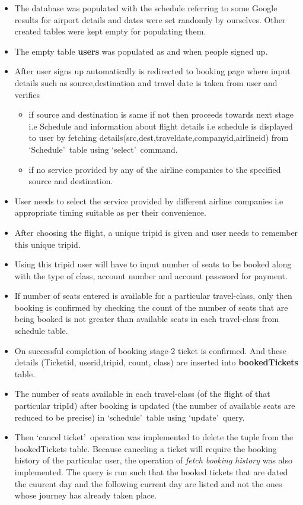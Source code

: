 \documentclass[hidelinks=true]{article}
\begin{document}
\begin{itemize}
\item The database was populated with the schedule referring to some Google results for airport details and dates were set randomly by ourselves. Other created tables were kept empty for populating them.
\item The empty table \textbf{users} was populated as and when people signed up.
\item After user signs up automatically is redirected to booking page where input details such as source,destination and travel date is taken from user and verifies
\begin{itemize}
\item if source and destination is same if not then proceeds towards next stage i.e Schedule and information about flight details i.e schedule is displayed to user by fetching details(src,dest,traveldate,companyid,airlineid) from \lq Schedule\rq\  table using \lq select\rq\  command. 
\item if no service provided by any of the airline companies to the specified source and destination.
\end{itemize}
\item  User needs to select the service provided by different airline companies i.e appropriate timing suitable as per their convenience.
\item After choosing the flight, a unique tripid is given and user needs to remember this unique tripid.
\item Using this tripid user will have to input number of seats to be booked along with the type of class, account number and account password for payment.
\item If number of seats entered is available for a particular travel-class, only then booking is confirmed by checking the count of the number of seats that are being booked is not greater than available seats in each travel-class from schedule table.
\item On successful completion of booking stage-2 ticket is confirmed. And these details (Ticketid, userid,tripid, count, class) are inserted into \textbf{bookedTickets} table.
\item The number of seats available in each travel-class (of the flight of that particular tripId) after booking is updated (the number of available seats are reduced to be precise) in \lq schedule\rq\ table using \lq update\rq\ query. 
\item Then \lq cancel ticket\rq\ operation was implemented to delete the tuple from the bookedTickets table. Because canceling a ticket will require the booking history of the particular user, the operation of \emph{fetch booking history} was also implemented. The query is run such that the booked tickets that are dated the cuurent day and the following current day are listed and not the ones whose journey has already taken place.

\end{itemize}
\end{document}

